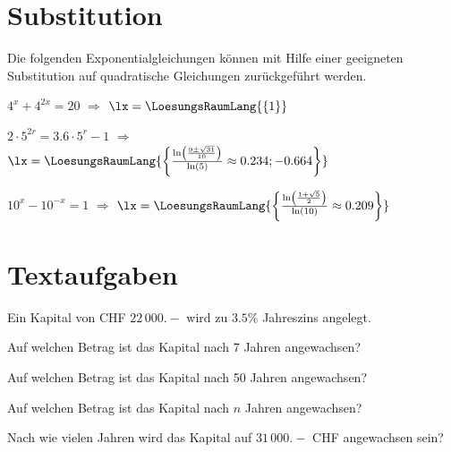 \platzFuerBerechnungenBisEndeSeite{}

\section{Substitution}
Die folgenden Exponentialgleichungen können mit Hilfe einer geeigneten
Substitution auf quadratische Gleichungen zurückgeführt werden.

\begin{bbwAufgabenBlock}
\item $4^x + 4^{2x} = 20$ $\Longrightarrow$ $\lx=\LoesungsRaumLang{\{  1   \}}$ \plz{}
\item $2\cdot{}5^{2r} = 3.6\cdot{}5^r - 1$ $\Longrightarrow$
$\lx=\LoesungsRaumLang{\left\{   \frac{\ln\left(\frac{9\pm\sqrt{31}}{10}\right)}{\ln(5)} \approx
0.234; -0.664 \right\}
}$ \plz{}
\item $10^x - 10^{-x} = 1$ $\Longrightarrow$ $\lx=\LoesungsRaumLang{\left\{  \frac{\ln\left(\frac{1+\sqrt{5}}{2}\right)}{\ln(10)} \approx  0.209   \right\}}$ \plz{}

\end{bbwAufgabenBlock}

\section{Textaufgaben}

Ein Kapital von CHF $22\,000.-$ wird zu $3.5\%$ Jahreszins angelegt.
\begin{bbwAufgabenBlock}
\item Auf welchen Betrag ist das Kapital nach 7 Jahren
angewachsen? \plz{}
\item Auf welchen Betrag ist das Kapital nach 50 Jahren
angewachsen?  \plz{}
\item Auf welchen Betrag ist das Kapital nach $n$ Jahren
angewachsen?  \plz{} \noTRAINER{\newpage}
\item Nach wie vielen Jahren wird das Kapital auf $31\,000.-$ CHF
angewachsen sein?  \plz{}
\end{bbwAufgabenBlock}
\platzFuerBerechnungenBisEndeSeite{}

